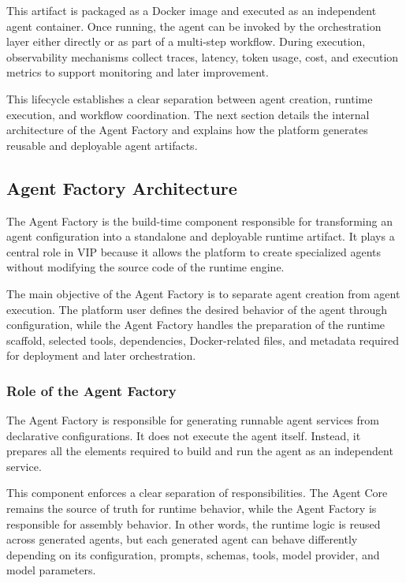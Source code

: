 This artifact is packaged as a Docker image and executed as an independent agent container. Once running, the agent can be invoked by the orchestration layer either directly or as part of a multi-step workflow. During execution, observability mechanisms collect traces, latency, token usage, cost, and execution metrics to support monitoring and later improvement.

This lifecycle establishes a clear separation between agent creation, runtime execution, and workflow coordination. The next section details the internal architecture of the Agent Factory and explains how the platform generates reusable and deployable agent artifacts.

\subsection{Agent Factory Architecture}

The Agent Factory is the build-time component responsible for transforming an agent configuration into a standalone and deployable runtime artifact. It plays a central role in VIP because it allows the platform to create specialized agents without modifying the source code of the runtime engine.

The main objective of the Agent Factory is to separate agent creation from agent execution. The platform user defines the desired behavior of the agent through configuration, while the Agent Factory handles the preparation of the runtime scaffold, selected tools, dependencies, Docker-related files, and metadata required for deployment and later orchestration.

\subsubsection{Role of the Agent Factory}

The Agent Factory is responsible for generating runnable agent services from declarative configurations. It does not execute the agent itself. Instead, it prepares all the elements required to build and run the agent as an independent service.

This component enforces a clear separation of responsibilities. The Agent Core remains the source of truth for runtime behavior, while the Agent Factory is responsible for assembly behavior. In other words, the runtime logic is reused across generated agents, but each generated agent can behave differently depending on its configuration, prompts, schemas, tools, model provider, and model parameters.

